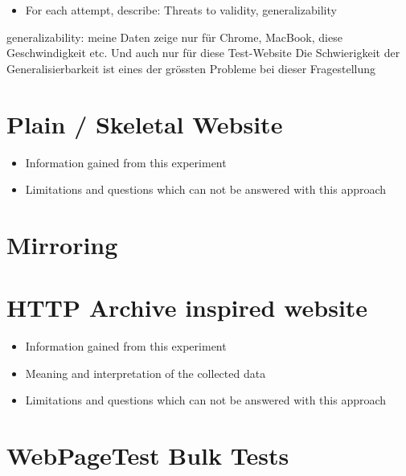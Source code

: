 \begin{itemize}
    \item For each attempt, describe: Threats to validity, generalizability
\end{itemize}

generalizability: meine Daten zeige nur für Chrome, MacBook, diese Geschwindigkeit etc.
Und auch nur für diese Test-Website
Die Schwierigkeit der Generalisierbarkeit ist eines der grössten Probleme bei dieser Fragestellung



\section{Plain / Skeletal Website}

\begin{itemize}
\item Information gained from this experiment
\item Limitations and questions which can not be answered with this approach
\end{itemize}


\section{Mirroring}


\section{HTTP Archive inspired website}

\begin{itemize}
\item Information gained from this experiment
\item Meaning and interpretation of the collected data
\item Limitations and questions which can not be answered with this approach
\end{itemize}






\section{WebPageTest Bulk Tests}

